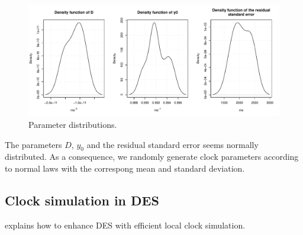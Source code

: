 \documentclass[11pt]{article}
\begin{document}
\begin{figure}[h!]
\centering
\includegraphics[width=\textwidth]{pictures/parameters.pdf}
\caption{Parameter distributions.}
\label{fig:drift-noise}
\end{figure}

The parameters $D$, $y_0$ and the residual standard error seems normally distributed. As a consequence, we randomly generate clock parameters according to normal laws with the correspong mean and standard deviation.

\subsection{Clock simulation in DES}

\cite{ring2010clock} explains how to enhance DES with efficient local clock simulation.

\newpage



\end{document}

